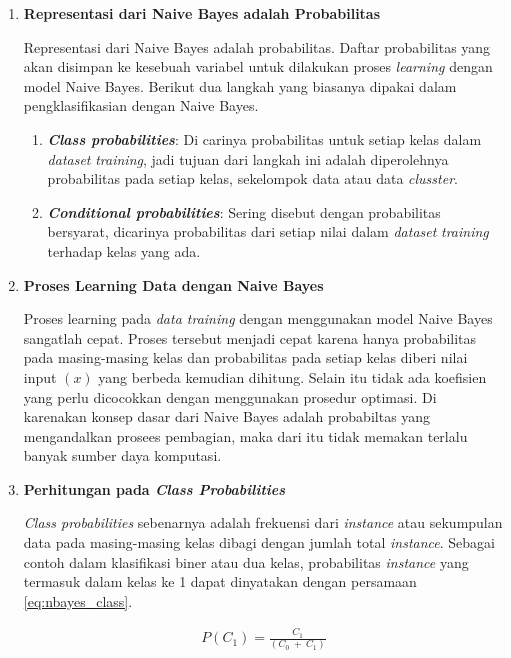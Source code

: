 \begin{enumerate}[label=\textbf{\arabic*).}]
	
	\item \textbf{Representasi dari Naive Bayes adalah Probabilitas}
	\setlength{\parindent}{0.8cm}

	Representasi dari Naive Bayes adalah probabilitas. Daftar probabilitas yang akan disimpan ke kesebuah variabel untuk dilakukan proses \textit{learning} dengan model Naive Bayes. Berikut dua langkah yang biasanya dipakai dalam pengklasifikasian dengan Naive Bayes.
	
	\begin{enumerate}[label=\textbf{\alph*.}]
		\item \textbf{\textit{Class probabilities}}: Di carinya probabilitas untuk setiap kelas dalam \textit{dataset} \textit{training}, jadi tujuan dari langkah ini adalah diperolehnya probabilitas pada setiap kelas, sekelompok data atau data \textit{clusster}.
		\item \textbf{\textit{Conditional probabilities}}: Sering disebut dengan probabilitas bersyarat, dicarinya probabilitas dari setiap nilai dalam \textit{dataset} \textit{training} terhadap kelas yang ada.
	\end{enumerate}

	\item \textbf{Proses Learning Data dengan Naive Bayes}

	Proses learning pada \textit{data training} dengan menggunakan model Naive Bayes sangatlah cepat. Proses tersebut menjadi cepat karena hanya probabilitas pada masing-masing kelas dan probabilitas pada setiap kelas diberi nilai input $(x)$ yang berbeda kemudian dihitung. Selain itu tidak ada koefisien yang perlu dicocokkan dengan menggunakan prosedur optimasi. Di karenakan konsep dasar dari Naive Bayes adalah probabiltas yang mengandalkan prosees pembagian, maka dari itu tidak memakan terlalu banyak sumber daya komputasi.

	\item \textbf{Perhitungan pada \textit{Class Probabilities}}

	\textit{Class probabilities} sebenarnya adalah frekuensi dari \textit{instance} atau sekumpulan data pada masing-masing kelas dibagi dengan jumlah total \textit{instance}. Sebagai contoh dalam klasifikasi biner atau dua kelas, probabilitas \textit{instance} yang termasuk dalam kelas ke 1 dapat dinyatakan dengan persamaan \ref{eq:nbayes_class}.
	
	\begin{equation}\label{eq:nbayes_class}
	\begin{split}
	P(C_{1}) = \frac{C_{1}}{(C_{0}\ +\ C_{1})}
	\end{split}
	\end{equation}
	

\end{enumerate}
